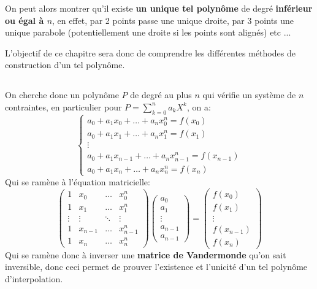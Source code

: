 On peut alors montrer qu'il existe \textbf{un unique tel polynôme} de degré \textbf{inférieur ou égal à \(n\)}, en effet, par 2 points passe une unique droite, par 3 points une unique parabole (potentiellement une droite si les points sont alignés) etc ...\<

L'objectif de ce chapitre sera donc de comprendre les différentes méthodes de construction d'un tel polynôme.

\subsection*{}
On cherche donc un polynôme \(P\) de degré au plus \(n\) qui vérifie un système de \(n\) contraintes, en particulier pour \(P = \sum_{k=0}^{n} a_kX^k\), on a:
\[
   \begin{cases}
      a_0 + a_1x_0 + \ldots + a_nx_0^n = f(x_0)\\
      a_0 + a_1x_1 + \ldots + a_nx_1^n = f(x_1)\\
      \vdots\\
      a_0 + a_1x_{n-1} + \ldots + a_nx_{n-1}^n = f(x_{n-1})\\
      a_0 + a_1x_{n} + \ldots + a_nx_{n}^n = f(x_{n})
   \end{cases}
\]
Qui se ramène à l'équation matricielle:
\[
   \left(\begin{array}{cccc}
      1 & x_0 & \ldots & x_0^n\\ 
      1 & x_1 & \ldots & x_1^n\\
      \vdots & \vdots & \ddots & \vdots\\
      1 & x_{n-1} & \ldots & x_{n-1}^{n}\\ 
      1 & x_{n} & \ldots & x_{n}^n
   \end{array}\right) 
   \left(\begin{array}{c}
      a_0\\ 
      a_1\\
      \vdots\\
      a_{n-1}\\ 
      a_{n-1}
   \end{array}\right) =
   \left(\begin{array}{c}
      f(x_0)\\ 
      f(x_1)\\
      \vdots\\
      f(x_{n-1})\\ 
      f(x_{n})
   \end{array}\right)
\]
Qui se ramène donc à inverser une \textbf{matrice de Vandermonde} qu'on sait inversible, donc ceci permet de prouver l'existence et l'unicité d'un tel polynôme d'interpolation.

